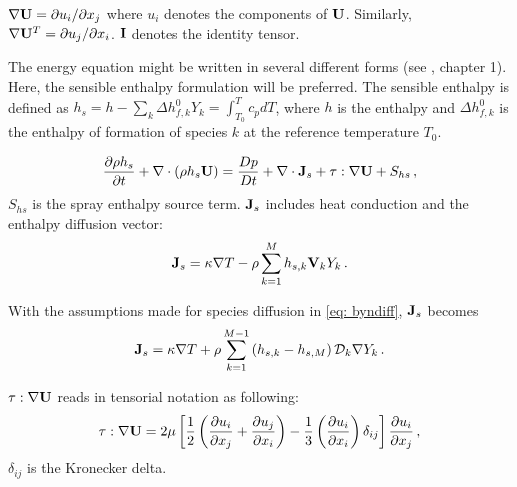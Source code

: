 \begin{notation}
 $\nabla \mathbf{U} = \partial u_i/\partial x_j$ where $u_i$ denotes the
components of $\mathbf{U}$. Similarly, $\nabla \mathbf{U}^{T} = \partial
u_j/\partial x_i$. $\mathbf{I}$ denotes the identity tensor.
\end{notation}

The energy equation might be written in several different forms
(see \cite{poinsot2005theoretical}, chapter 1). Here, the sensible enthalpy
formulation will be preferred. The sensible enthalpy is defined as $h_s = h -
\sum_{k} \Delta h^{0}_{f,k} Y_k = \int_{T_{0}}^{T} c_{p} dT$, where $h$ is the
enthalpy and $\Delta h^{0}_{f,k}$ is the enthalpy of formation of species $k$ at
the reference temperature $T_{0}$.

\begin{equation}\label{ns: energy}
 \frac{\partial \rho h_s}{\partial t} +  \nabla \cdot \left( \rho h_s \bv{U}
\right) = \frac{Dp}{Dt} + \nabla \cdot \bv{J}_s +  \bv{\tau} : \nabla\bv{U} +
 S_{hs}\, ,
 \end{equation}
$S_{hs}$ is the spray enthalpy source term. $\mathbf{J}_s$ includes heat conduction and the enthalpy
diffusion vector:
\begin{equation}
\mathbf{J}_s =  \kappa \nabla T - \rho \sum_{k=1}^{M} h_{s,k} \mathbf{V}_k Y_k \, .
\end{equation}

With the assumptions made for species diffusion in \eqref{eq: byndiff},
$\mathbf{J}_s$ becomes
\begin{equation}
\mathbf{J}_s =  \kappa \nabla T + \rho \sum_{k=1}^{M-1} \left( h_{s,k}
-h_{s,M}\right) \mathcal{D}_k \nabla Y_k \, .
\end{equation}

\begin{notation}
 $\tau : \nabla \mathbf{U}$ reads in tensorial notation as following:
\begin{equation}
 \tau : \nabla \mathbf{U} = 2\mu\left[ \frac{1}{2} \left( \frac{\partial
u_i}{\partial x_j}+\frac{\partial u_j}{\partial x_i}\right)-\frac{1}{3}\left(
\frac{\partial u_i}{\partial x_i} \right) \delta_{ij} \right]  \frac{\partial
u_i}{\partial x_j} \, ,
\end{equation} $\delta_{ij}$ is the Kronecker delta.
\end{notation}



